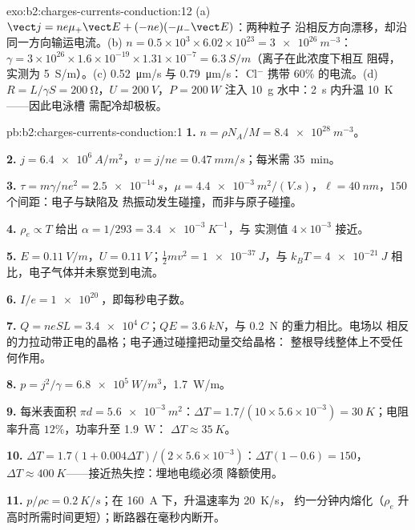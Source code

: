 \begin{solution}{exo:b2:charges-currents-conduction:12}
(a) $\vect j = ne\mu_+\vect E + (-ne)(-\mu_-\vect E)$：两种粒子
沿相反方向漂移，却沿同一方向输运电流。(b) $n =
0.5 \times 10^3 \times 6.02 \times 10^{23} = \qty{3e26}{m^{-3}}$：$\gamma = 3 \times 10^{26} \times 1.6 \times 10^{-19}
\times 1.31 \times 10^{-7} = \qty{6.3}{S/m}$（离子在此浓度下相互
阻碍，实测为 \qty{5}{S/m}）。(c) \qty{0.52}{\micro m/s} 与 \qty{0.79}{\micro m/s}：
Cl$^-$ 携带 $60\%$ 的电流。(d) $R = L/\gamma S = \qty{200}{\ohm}$，$U = \qty{200}{V}$，$P =
\qty{200}{W}$ 注入 \qty{10}{g} 水中：\qty{2}{s} 内升温 \qty{10}{K}——因此电泳槽
需配冷却极板。
\end{solution}

\begin{solution}{pb:b2:charges-currents-conduction:1}
\textbf{1.} $n = \rho N_A/M = \qty{8.4e28}{m^{-3}}$。

\textbf{2.} $j = \qty{6.4e6}{A/m^2}$，$v = j/ne = \qty{0.47}{mm/s}$；每米需 \qty{35}{min}。

\textbf{3.} $\tau = m\gamma/ne^2 = \qty{2.5e-14}{s}$，$\mu = \qty{4.4e-3}{m^2/(V.s)}$，$\ell =
\qty{40}{nm}$，$150$ 个间距：电子与缺陷及
热振动发生碰撞，而非与原子碰撞。

\textbf{4.} $\rho_e \propto T$ 给出 $\alpha = 1/293 = \qty{3.4e-3}{K^{-1}}$，与
实测值 $4 \times 10^{-3}$ 接近。

\textbf{5.} $E = \qty{0.11}{V/m}$，$U = \qty{0.11}{V}$；$\tfrac12mv^2 = \qty{1e-37}{J}$，与
$k_BT = \qty{4e-21}{J}$ 相比，电子气体并未察觉到电流。

\textbf{6.} $I/e = \qty{1e20}{}$，即每秒电子数。

\textbf{7.} $Q = neSL = \qty{3.4e4}{C}$；$QE = \qty{3.6}{kN}$，与
\qty{0.2}{N} 的重力相比。电场以
相反的力拉动带正电的晶格；电子通过碰撞把动量交给晶格：
整根导线整体上不受任何作用。

\textbf{8.} $p = j^2/\gamma = \qty{6.8e5}{W/m^3}$，\qty{1.7}{W/m}。

\textbf{9.} 每米表面积 $\pi d = \qty{5.6e-3}{m^2}$：$\Delta T = 1.7/(10 \times 5.6 \times
10^{-3}) = \qty{30}{K}$；电阻率升高 $12\%$，功率升至 \qty{1.9}{W}：
$\Delta T \approx \qty{35}{K}$。

\textbf{10.} $\Delta T = 1.7(1 + 0.004\Delta T)/(2 \times 5.6 \times 10^{-3})$：$\Delta T(1 - 0.6) = 150$，
$\Delta T \approx \qty{400}{K}$——接近热失控：埋地电缆必须
降额使用。

\textbf{11.} $p/\rho c = \qty{0.2}{K/s}$；在 \qty{160}{A} 下，升温速率为 \qty{20}{K/s}，
约一分钟内熔化（$\rho_e$ 升高时所需时间更短）；断路器在毫秒内断开。


\end{solution}
